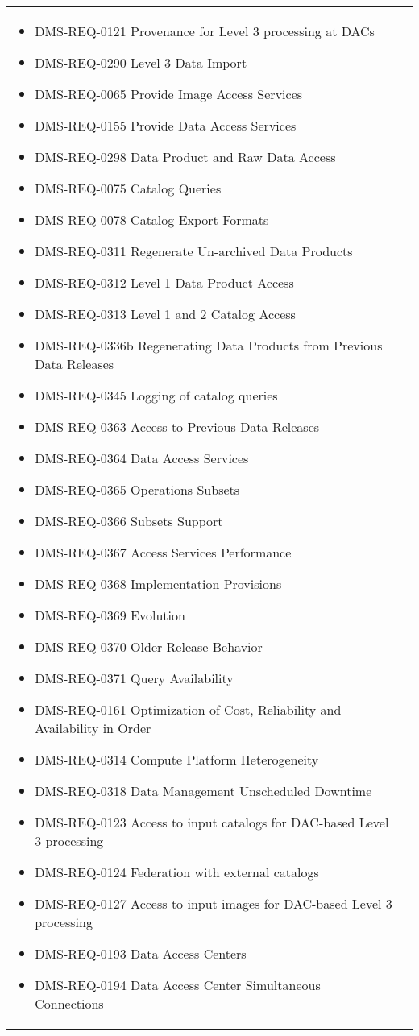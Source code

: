\begin{xtabular}{lp{0.7\textwidth}}
\begin{itemize}
\item DMS-REQ-0121 Provenance for Level 3 processing at DACs
\item DMS-REQ-0290 Level 3 Data Import
\item DMS-REQ-0065 Provide Image Access Services
\item DMS-REQ-0155 Provide Data Access Services
\item DMS-REQ-0298 Data Product and Raw Data Access
\item DMS-REQ-0075 Catalog Queries
\item DMS-REQ-0078 Catalog Export Formats
\item DMS-REQ-0311 Regenerate Un-archived Data Products
\item DMS-REQ-0312 Level 1 Data Product Access
\item DMS-REQ-0313 Level 1 and 2 Catalog Access
\item DMS-REQ-0336b Regenerating Data Products from Previous Data Releases
\item DMS-REQ-0345 Logging of catalog queries
\item DMS-REQ-0363 Access to Previous Data Releases
\item DMS-REQ-0364 Data Access Services
\item DMS-REQ-0365 Operations Subsets
\item DMS-REQ-0366 Subsets Support
\item DMS-REQ-0367 Access Services Performance
\item DMS-REQ-0368 Implementation Provisions
\item DMS-REQ-0369 Evolution
\item DMS-REQ-0370 Older Release Behavior
\item DMS-REQ-0371 Query Availability
\item DMS-REQ-0161 Optimization of Cost, Reliability and Availability in Order
\item DMS-REQ-0314 Compute Platform Heterogeneity
\item DMS-REQ-0318 Data Management Unscheduled Downtime
\item DMS-REQ-0123 Access to input catalogs for DAC-based Level 3 processing
\item DMS-REQ-0124 Federation with external catalogs
\item DMS-REQ-0127 Access to input images for DAC-based Level 3 processing
\item DMS-REQ-0193 Data Access Centers
\item DMS-REQ-0194 Data Access Center Simultaneous Connections

\end{itemize}
\end{xtabular}
